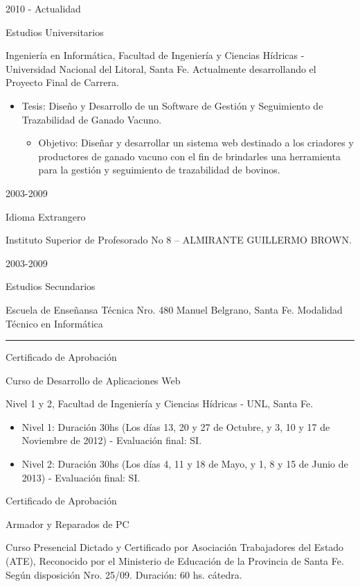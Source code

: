 \documentclass[a4paper,10pt]{article}
\newlength{\cvcolumngapwidth}
\newlength{\cvleftcolumnwidth}
\newlength{\cvrightcolumnwidth}
\newcommand{\cvsectionstyle}[1]{{\normalsize\cvsectionfont\textcolor{cvsectioncolor}{#1}}}
\newcommand{\cvtitlestyle}[1]{{\large\cvtitlefont\textcolor{cvtitlecolor}{#1}}}
\newcommand{\cvdurationstyle}[1]{{\small\cvdurationfont\textcolor{cvdurationcolor}{#1}}}
\newcommand{\cvheadingstyle}[1]{{\normalsize\cvheadingfont\textcolor{cvheadingcolor}{#1}}}
\newlength{\cvafteritemskipamount}
\newlength{\cvaftersectionskipamount}
\newlength{\cvaftertitleskipamount}
\newlength{\cvparskip}
\newcommand{\cvsection}[1]{
    \begin{minipage}[t]{\cvleftcolumnwidth}
        \raggedleft\cvsectionstyle{#1}
    \end{minipage}%
    \hspace{\cvcolumngapwidth}%
    \begin{minipage}[t]{\cvrightcolumnwidth}
        \textcolor{cvrulecolor}{\rule{\cvrightcolumnwidth}{0.3mm}}
    \end{minipage}

    \vspace{\cvaftersectionskipamount}
}
\newcommand{\cvitem}[2]{
    \begin{minipage}[t]{\cvleftcolumnwidth}
        \raggedleft #1
    \end{minipage}%
    \hspace{\cvcolumngapwidth}%
    \begin{minipage}[t]{\cvrightcolumnwidth}
        \setlength{\parskip}{\cvparskip} #2
    \end{minipage}

    \vspace{\cvafteritemskipamount}
}
\newcommand{\cvtitle}[1]{
    \cvtitlestyle{#1}

    \vspace{\cvaftertitleskipamount}
    \vspace{-\cvparskip}
}
\begin{document}
\cvitem{
    \cvdurationstyle{2010 - Actualidad}
}{
    \cvtitle{Estudios Universitarios}
    Ingeniería en Informática, Facultad de Ingeniería y Ciencias Hídricas - Universidad Nacional del Litoral, Santa Fe. Actualmente desarrollando el Proyecto Final de Carrera.
    \begin{itemize}
        \item Tesis: Diseño y Desarrollo de un Software de Gestión y Seguimiento de Trazabilidad de Ganado Vacuno.
        \begin{itemize}
            \item Objetivo: Diseñar y desarrollar un sistema web destinado a los criadores y productores de ganado vacuno con el fin
de brindarles una herramienta para la gestión y seguimiento de trazabilidad de bovinos.
        \end{itemize}
    \end{itemize}
}

\cvitem{
    \cvdurationstyle{2003-2009}
}{
    \cvtitle{Idioma Extrangero}
    Instituto Superior de Profesorado No 8 – ALMIRANTE GUILLERMO BROWN.
}

\cvitem{
    \cvdurationstyle{2003-2009}
}{
    \cvtitle{Estudios Secundarios}
    Escuela de Enseñansa Técnica Nro. 480 Manuel Belgrano, Santa Fe. Modalidad Técnico en Informática
}

\cvsection{CURSOS Y CERTIFICADOS}

\cvitem{
    \cvheadingstyle{Certificado de Aprobación}
}{
    \cvtitle{Curso de Desarrollo de Aplicaciones Web} Nivel 1 y 2, Facultad de Ingeniería y Ciencias Hídricas - UNL, Santa Fe.
    \begin{itemize}
        \item Nivel 1: Duración 30hs (Los días 13, 20 y 27 de Octubre, y 3, 10 y 17 de Noviembre de 2012) - Evaluación final: SI.
        \item Nivel 2: Duración 30hs (Los días 4, 11 y 18 de Mayo, y 1, 8 y 15 de Junio de 2013) - Evaluación final: SI.
    \end{itemize}
}

\cvitem{
    \cvheadingstyle{Certificado de Aprobación}
}{
    \cvtitle{Armador y Reparados de PC}
    Curso Presencial Dictado y Certificado por Asociación Trabajadores del Estado (ATE), Reconocido por el Ministerio de Educación de la Provincia de Santa Fe. Según disposición Nro. 25/09.
    Duración: 60 hs. cátedra.
}

\end{document}
